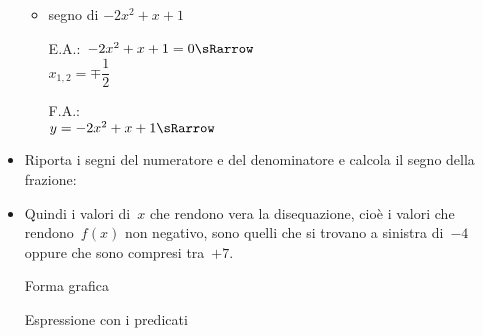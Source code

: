 \begin{esempio}
\begin{itemize}
\begin{itemize}
 \item segno di \(-2x^2 +x +1\)\\
 \begin{minipage}{.35\textwidth}
  E.A.:~\(-2x^2 +x +1=0 \sRarrow \) \\
  \(x_{1,2}=\mp\dfrac{1}{2}\)
 \end{minipage}
 \begin{minipage}{.25\textwidth}
  F.A.:\\
  \(y=-2x^2 +x +1 \sRarrow\)
 \end{minipage}
 \begin{minipage}{.38\textwidth}
  \begin{inaccessibleblock}
  \parabolaamidma{}{}
\end{inaccessibleblock}
 \end{minipage}
 
\end{itemize}

 \item Riporta i segni del numeratore e del denominatore e calcola
il segno della frazione:

\begin{inaccessibleblock}
\vspace{2em}
  \begin{center}
  \segnofrazionec
  \end{center}
\end{inaccessibleblock}

 \item Quindi i valori di~\(x\) che rendono vera la disequazione, cioè i 
valori
  che rendono~\(f(x)\) non negativo, sono quelli 
  che si trovano a sinistra di~\(-4\) oppure che sono compresi 
  tra~\(+7\).\\

  \begin{minipage}{.32\textwidth}
  \vspace{.7em}
  Forma grafica\\ [-.8em]
  
\begin{inaccessibleblock}
  \begin{center}
  \end{center}
\end{inaccessibleblock}
\vspace{.1em}

  \end{minipage}
  \begin{minipage}{.32\textwidth}
  Espressione con i predicati\\[-.3em]
  

\end{minipage}
\end{itemize}
\end{esempio}
